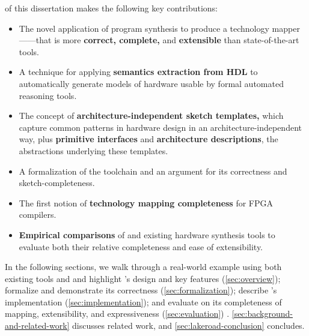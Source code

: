  of this dissertation
makes
  the following key contributions:
\begin{itemize}[leftmargin=*]
\item The novel application of program synthesis
  to produce a technology mapper---\lr---that is
  more \textbf{correct, complete,} and \textbf{extensible} than state-of-the-art 
  tools.
\item A technique for applying
  \textbf{semantics extraction from HDL}
  to automatically generate models
  of hardware usable by 
  formal automated reasoning tools.
\item The concept of 
  \textbf{architecture-independent sketch templates,}
  which capture common patterns in hardware design
  in an architecture-independent way,
  plus \textbf{primitive interfaces} and \textbf{architecture descriptions}, the abstractions
  underlying these templates.
\item A formalization of the \lr
  toolchain and an argument
  for its correctness and sketch-completeness.
\item The first notion of \textbf{technology
  mapping completeness} for FPGA
  compilers.
\item \textbf{Empirical comparisons }of
  \lr and existing hardware synthesis
  tools to evaluate both their
  relative completeness and
  ease of extensibility.


  



\end{itemize}

In the following sections, we walk through a real-world example
  using both existing tools
  and \lr
  and 
  highlight \lr's design and key features (\cref{sec:overview}); 
  formalize \lr and
  demonstrate its correctness (\cref{sec:formalization}); 
  describe \lr's implementation (\cref{sec:implementation}); and 
  evaluate \lr on its
  completeness of mapping,
  extensibility,
  and expressiveness (\cref{sec:evaluation}) .
\cref{sec:background-and-related-work}
  discusses related work, and
  \cref{sec:lakeroad-conclusion} concludes.